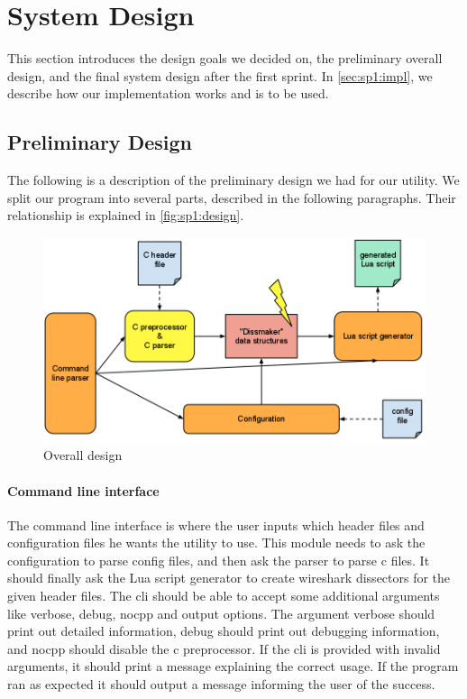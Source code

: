 \section{System Design}
\label{sec:sp1:design}
This section introduces the design goals we decided on, the preliminary overall
design, and the final system design after the first sprint. In
\autoref{sec:sp1:impl}, we describe how our implementation works and is to be
used.

\subsection{Preliminary Design}
The following is a description of the preliminary design we had for our
\gls{utility}. We split our program into several parts, described in the
following paragraphs. Their relationship is explained in
\autoref{fig:sp1:design}.

\begin{figure}[!htb]
	\center
	\includegraphics[width=\textwidth]{./sprints/img/design}
	\caption{Overall design\label{fig:sp1:design}}
\end{figure}

\paragraph{Command line interface}
The command line interface is where the user inputs which \gls{header} files and
configuration files he wants the \gls{utility} to use. This module needs to ask
the configuration to parse config files, and then ask the parser to parse \Gls{c}
files. It should finally ask the Lua script generator to create \Gls{wireshark} \glspl{dissector}
for the given \gls{header} files. The \gls{cli} should be able to accept some additional
arguments like verbose, debug, nocpp and output options.
The argument verbose should print out detailed information,
debug should print out debugging information, and nocpp should
disable the \Gls{c} \gls{preprocessor}. If the \gls{cli} is provided with invalid arguments, 
it should print a message explaining the correct usage.
If the program ran as expected it should output a message informing
the user of the success. 

